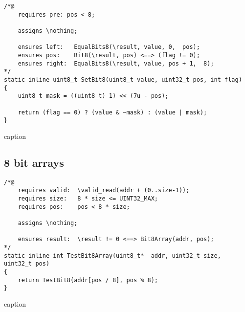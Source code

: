 \begin{listing}[hbt]
\begin{minipage}{0.99\textwidth}
\begin{lstlisting}[style=acsl-block]
/*@
    requires pre: pos < 8;

    assigns \nothing;

    ensures left:   EqualBits8(\result, value, 0,  pos);
    ensures pos:    Bit8(\result, pos) <==> (flag != 0);
    ensures right:  EqualBits8(\result, value, pos + 1,  8);
*/
static inline uint8_t SetBit8(uint8_t value, uint32_t pos, int flag)
{
    uint8_t mask = ((uint8_t) 1) << (7u - pos);

    return (flag == 0) ? (value & ~mask) : (value | mask);
}
\end{lstlisting}
\end{minipage}
\caption{caption}
\end{listing}

\FloatBarrier

\subsection{8 bit arrays}

\begin{listing}[hbt]
\begin{minipage}{0.99\textwidth}
\begin{lstlisting}[style=acsl-block]
/*@
    requires valid:  \valid_read(addr + (0..size-1));
    requires size:   8 * size <= UINT32_MAX;
    requires pos:    pos < 8 * size;

    assigns \nothing;

    ensures result:  \result != 0 <==> Bit8Array(addr, pos);
*/
static inline int TestBit8Array(uint8_t*  addr, uint32_t size, uint32_t pos)
{
    return TestBit8(addr[pos / 8], pos % 8);
}
\end{lstlisting}
\end{minipage}
\caption{caption}
\end{listing}



